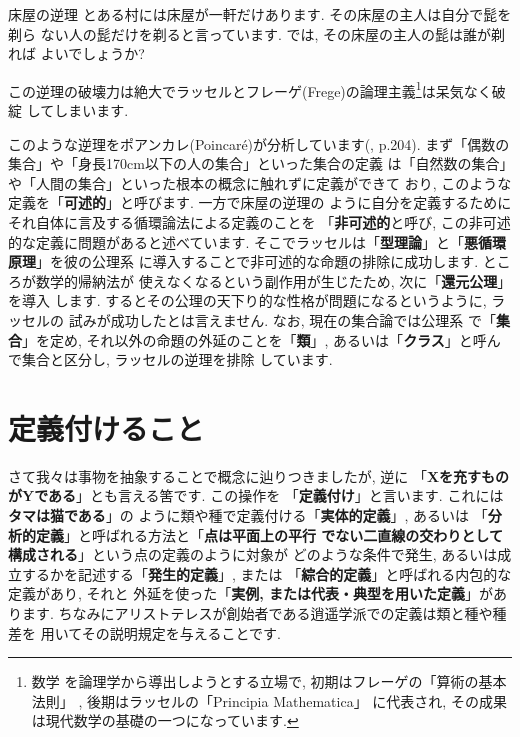 \documentclass[b5j,8pt,twocolumn]{ltjsarticle}
\begin{document}
\begin{itembox}[c]{{床屋の逆理}}
\quad とある村には床屋が一軒だけあります. その床屋の主人は自分で髭を剃ら
ない人の髭だけを剃ると言っています. では, その床屋の主人の髭は誰が剃れば
よいでしょうか?
\end{itembox}


この逆理の破壊力は絶大でラッセルとフレーゲ(Frege)の論理主義\footnote{数学
を論理学から導出しようとする立場で, 初期はフレーゲの「算術の基本法則」
\cite{フレーゲ}, 後期はラッセルの「Principia Mathematica」\cite{Russell}
に代表され, その成果は現代数学の基礎の一つになっています.}は呆気なく破綻
してしまいます.
\newline


このような逆理をポアンカレ(Poincar\'e)が分析しています(\cite{ポアンカレ},
p.204). まず「偶数の集合」や「身長170cm以下の人の集合」といった集合の定義
は「自然数の集合」や「人間の集合」といった根本の概念に触れずに定義ができて
おり, このような定義を「\textbf{可述的}」と呼びます. 一方で床屋の逆理の
ように自分を定義するためにそれ自体に言及する循環論法による定義のことを
「\textbf{非可述的}と呼び, この非可述的な定義に問題があると述べています.
 そこでラッセルは「\textbf{型理論}」と「\textbf{悪循環原理}」を彼の公理系
に導入することで非可述的な命題の排除に成功します. ところが数学的帰納法が
使えなくなるという副作用が生じたため, 次に「\textbf{還元公理}」を導入
します. するとその公理の天下り的な性格が問題になるというように, ラッセルの
試みが成功したとは言えません\cite{Russell}. なお, 現在の集合論では公理系
で「\textbf{集合}」を定め, それ以外の命題の外延のことを「\textbf{類}」,
 あるいは「\textbf{クラス}」と呼んで集合と区分し, ラッセルの逆理を排除
しています.

\section{定義付けること}

さて我々は事物を抽象することで概念に辿りつきましたが, 逆に
「\textbf{Xを充すものがYである}」とも言える筈です. この操作を
「\textbf{定義付け}」と言います. これには\textbf{タマは猫である}」の
ように類や種で定義付ける「\textbf{実体的定義}」, あるいは
「\textbf{分析的定義}」と呼ばれる方法と「\textbf{点は平面上の平行
でない二直線の交わりとして構成される}」という点の定義のように対象が
どのような条件で発生, あるいは成立するかを記述する「\textbf{発生的定義}」,
 または 「\textbf{綜合的定義}」と呼ばれる内包的な定義があり, それと
外延を使った「\textbf{実例, または代表・典型を用いた定義}」があります.
 ちなみにアリストテレスが創始者である逍遥学派での定義は類と種や種差を
用いてその説明規定を与えることです.
\end{document}
